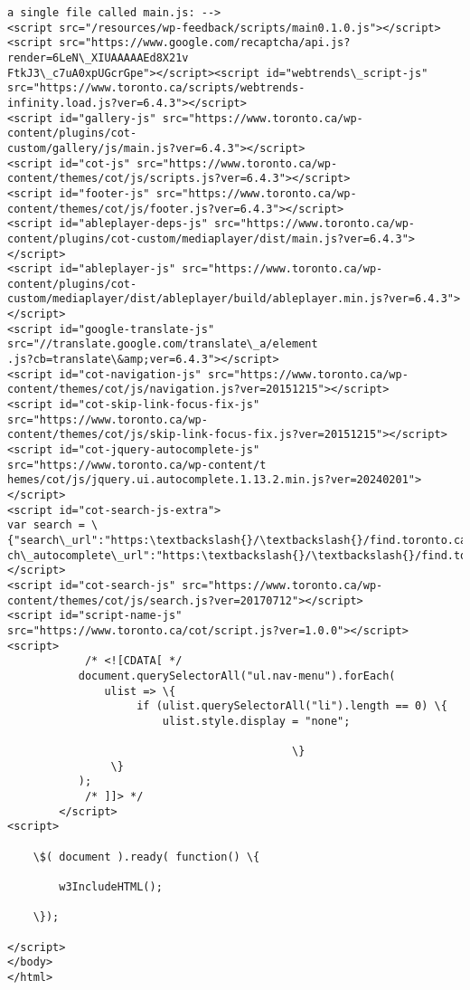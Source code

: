 \documentclass[11pt]{article}
\begin{document}
\begin{Verbatim}[commandchars=\\\{\}]
a single file called main.js: -->
<script src="/resources/wp-feedback/scripts/main0.1.0.js"></script>
<script src="https://www.google.com/recaptcha/api.js?render=6LeN\_XIUAAAAAEd8X21v
FtkJ3\_c7uA0xpUGcrGpe"></script><script id="webtrends\_script-js"
src="https://www.toronto.ca/scripts/webtrends-
infinity.load.js?ver=6.4.3"></script>
<script id="gallery-js" src="https://www.toronto.ca/wp-content/plugins/cot-
custom/gallery/js/main.js?ver=6.4.3"></script>
<script id="cot-js" src="https://www.toronto.ca/wp-
content/themes/cot/js/scripts.js?ver=6.4.3"></script>
<script id="footer-js" src="https://www.toronto.ca/wp-
content/themes/cot/js/footer.js?ver=6.4.3"></script>
<script id="ableplayer-deps-js" src="https://www.toronto.ca/wp-
content/plugins/cot-custom/mediaplayer/dist/main.js?ver=6.4.3"></script>
<script id="ableplayer-js" src="https://www.toronto.ca/wp-content/plugins/cot-
custom/mediaplayer/dist/ableplayer/build/ableplayer.min.js?ver=6.4.3"></script>
<script id="google-translate-js" src="//translate.google.com/translate\_a/element
.js?cb=translate\&amp;ver=6.4.3"></script>
<script id="cot-navigation-js" src="https://www.toronto.ca/wp-
content/themes/cot/js/navigation.js?ver=20151215"></script>
<script id="cot-skip-link-focus-fix-js" src="https://www.toronto.ca/wp-
content/themes/cot/js/skip-link-focus-fix.js?ver=20151215"></script>
<script id="cot-jquery-autocomplete-js" src="https://www.toronto.ca/wp-content/t
hemes/cot/js/jquery.ui.autocomplete.1.13.2.min.js?ver=20240201"></script>
<script id="cot-search-js-extra">
var search = \{"search\_url":"https:\textbackslash{}/\textbackslash{}/find.toronto.ca\textbackslash{}/webui\textbackslash{}/search.html","sear
ch\_autocomplete\_url":"https:\textbackslash{}/\textbackslash{}/find.toronto.ca\textbackslash{}/rest\textbackslash{}/v2\textbackslash{}/api\textbackslash{}/search"\};
</script>
<script id="cot-search-js" src="https://www.toronto.ca/wp-
content/themes/cot/js/search.js?ver=20170712"></script>
<script id="script-name-js"
src="https://www.toronto.ca/cot/script.js?ver=1.0.0"></script>
<script>
            /* <![CDATA[ */
           document.querySelectorAll("ul.nav-menu").forEach(
               ulist => \{
                    if (ulist.querySelectorAll("li").length == 0) \{
                        ulist.style.display = "none";

                                            \}
                \}
           );
            /* ]]> */
        </script>
<script>

    \$( document ).ready( function() \{

        w3IncludeHTML();

    \});

</script>
</body>
</html>

    \end{Verbatim}
\end{document}
